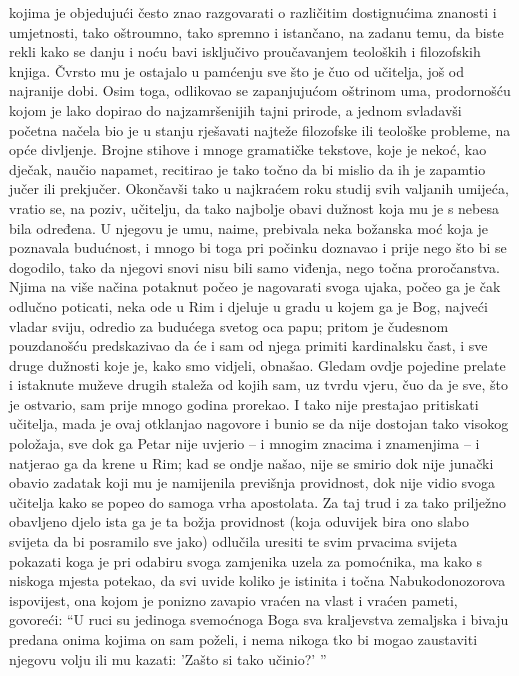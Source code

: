 \documentclass[a5paper,twoside]{article}
\begin{document}
kojima je objedujući često znao razgovarati o različitim dostignućima znanosti i umjetnosti, tako oštroumno, tako spremno i istančano, na zadanu temu, da biste rekli kako se danju i noću bavi isključivo proučavanjem teoloških i filozofskih knjiga.  Čvrsto mu je ostajalo u pamćenju sve što je čuo od učitelja, još od najranije dobi.  Osim toga, odlikovao se zapanjujućom oštrinom uma, prodornošću kojom je lako dopirao do najzamršenijih tajni prirode, a jednom svladavši početna načela bio je u stanju rješavati najteže filozofske ili teološke probleme, na opće divljenje.  Brojne stihove i mnoge gramatičke tekstove, koje je nekoć, kao dječak, naučio napamet, recitirao je tako točno da bi mislio da ih je zapamtio jučer ili prekjučer.
\pend
\pstart
Okončavši tako u najkraćem roku studij svih valjanih umijeća, vratio se, na poziv, učitelju, da tako najbolje obavi dužnost koja mu je s nebesa bila određena.  U njegovu je umu, naime, prebivala neka božanska moć koja je poznavala budućnost, i mnogo bi toga pri počinku doznavao i prije nego što bi se dogodilo, tako da njegovi snovi nisu bili samo viđenja, nego točna proročanstva.  Njima na više načina potaknut počeo je nagovarati svoga ujaka, počeo ga je čak odlučno poticati, neka ode u Rim i djeluje u gradu u kojem ga je Bog, najveći vladar sviju, odredio za budućega svetog oca papu; pritom je čudesnom pouzdanošću predskazivao da će i sam od njega primiti kardinalsku čast, i sve druge dužnosti koje je, kako smo vidjeli, obnašao.  Gledam ovdje pojedine prelate i istaknute muževe drugih staleža od kojih sam, uz tvrdu vjeru, čuo da je sve, što je ostvario, sam prije mnogo godina prorekao.  I tako nije prestajao pritiskati učitelja, mada je ovaj otklanjao nagovore i bunio se da nije dostojan tako visokog položaja, sve dok ga Petar nije uvjerio – i mnogim znacima i znamenjima – i natjerao ga da krene u Rim; kad se ondje našao, nije se smirio dok nije junački obavio zadatak koji mu je namijenila previšnja providnost, dok nije vidio svoga učitelja kako se  popeo do samoga vrha apostolata.  Za taj trud i za tako prilježno obavljeno djelo ista ga je ta božja providnost (koja oduvijek bira ono slabo svijeta da bi posramilo sve jako) odlučila uresiti  te svim prvacima svijeta pokazati koga je pri odabiru svoga zamjenika uzela za pomoćnika, ma kako s niskoga mjesta potekao, da svi uvide koliko je istinita i točna Nabukodonozorova ispovijest, ona kojom je ponizno zavapio vraćen na vlast i vraćen pameti, govoreći: ``U ruci su jedinoga svemoćnoga Boga sva kraljevstva zemaljska i bivaju predana onima kojima on sam poželi, i nema nikoga tko bi mogao zaustaviti njegovu volju ili mu kazati: 'Zašto si tako učinio?' ''
\end{document}
